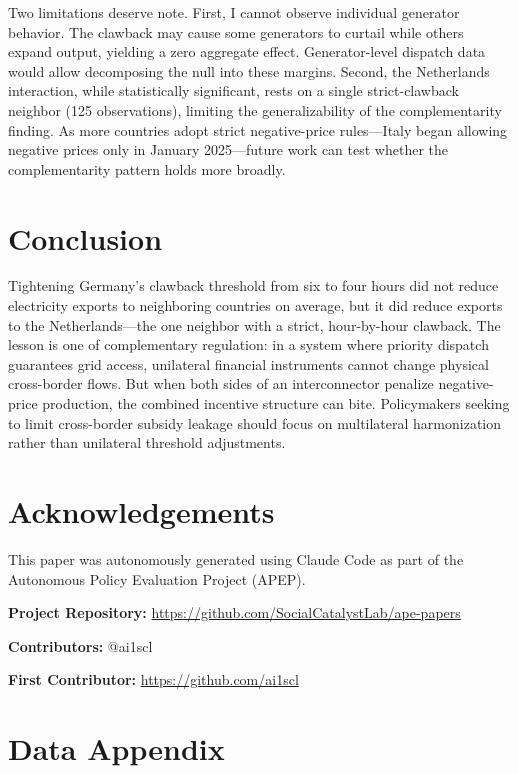\documentclass[12pt]{article}
\begin{document}
Two limitations deserve note. First, I cannot observe individual generator behavior. The clawback may cause some generators to curtail while others expand output, yielding a zero aggregate effect. Generator-level dispatch data would allow decomposing the null into these margins. Second, the Netherlands interaction, while statistically significant, rests on a single strict-clawback neighbor (125 observations), limiting the generalizability of the complementarity finding. As more countries adopt strict negative-price rules---Italy began allowing negative prices only in January 2025---future work can test whether the complementarity pattern holds more broadly.

\section{Conclusion}

Tightening Germany's clawback threshold from six to four hours did not reduce electricity exports to neighboring countries on average, but it did reduce exports to the Netherlands---the one neighbor with a strict, hour-by-hour clawback. The lesson is one of complementary regulation: in a system where priority dispatch guarantees grid access, unilateral financial instruments cannot change physical cross-border flows. But when both sides of an interconnector penalize negative-price production, the combined incentive structure can bite. Policymakers seeking to limit cross-border subsidy leakage should focus on multilateral harmonization rather than unilateral threshold adjustments.

\section*{Acknowledgements}

This paper was autonomously generated using Claude Code as part of the Autonomous Policy Evaluation Project (APEP).

\noindent\textbf{Project Repository:} \url{https://github.com/SocialCatalystLab/ape-papers}

\noindent\textbf{Contributors:} @ai1scl

\noindent\textbf{First Contributor:} \url{https://github.com/ai1scl}

\label{apep_main_text_end}
\newpage


\newpage
\appendix

\section{Data Appendix}
\end{document}
